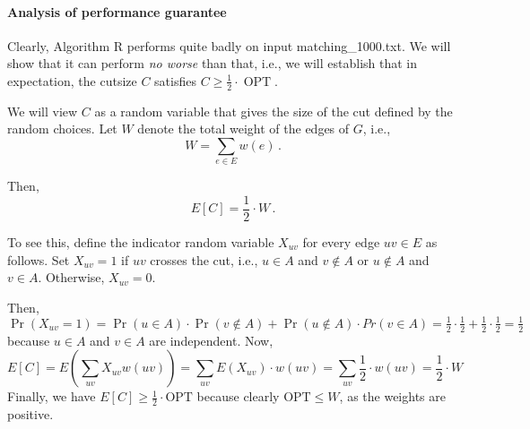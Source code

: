 \documentclass{tufte-handout}
\begin{document}
\begin{enumerate}
\noindent
{}
\end{enumerate}

\paragraph{Analysis of performance guarantee}

Clearly, Algorithm R performs quite badly on input 
  matching\_1000.txt.
We will show that it can perform \emph{no worse} than that, i.e., we
will establish that in expectation, the cutsize $C$ satisfies $C \geq
\frac{1}{2}\cdot \operatorname{OPT}$.


We will view $C$ as a random variable that gives the size of the cut
defined by the random choices.
Let $W$ denote the total weight of the edges of $G$, i.e.,
\[ W= \sum_{e\in E} w(e)\,.\]

Then,
\begin{equation}
E[C] = \textstyle\frac{1}{2}\cdot W\,.
\end{equation}

To see this, define the indicator random variable $X_{uv}$ for every
edge $uv\in E$ as follows.
Set $X_{uv}=1$ if $uv$ crosses the cut, i.e., $u\in A$ and $v\notin A$
or $u\notin A$ and $v\in A$.
Otherwise, $X_{uv} = 0$.

Then, $\Pr(X_{uv} = 1) = \Pr(u \in A) \cdot \Pr(v \notin A) + \Pr(u \notin A)
\cdot Pr(v \in A) = \frac{1}{2} \cdot \frac{1}{2} + \frac{1}{2} \cdot
\frac{1}{2} = \frac{1}{2}$ because $u \in A$ and $v \in A$ are independent.
Now, \[ E[C]= E(\sum_{uv} X_{uv}w(uv)) = \sum_{uv}E(X_{uv})\cdot{}w(uv) =
\sum_{uv}\frac{1}{2}\cdot{}w(uv) = \frac{1}{2}\cdot{}W \] Finally, we have
\(E[C]\geq \frac{1}{2} \cdot \text{OPT}\) because clearly
$\text{OPT} \leq W$, as the weights are positive.
\end{document}
